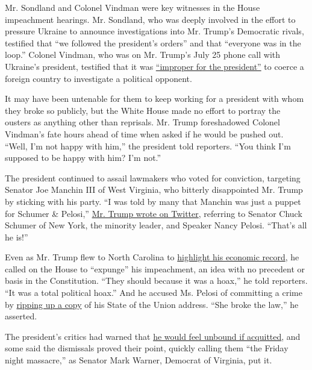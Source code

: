 Mr. Sondland and Colonel Vindman were key witnesses in the House
impeachment hearings. Mr. Sondland, who was deeply involved in the
effort to pressure Ukraine to announce investigations into Mr. Trump's
Democratic rivals, testified that ``we followed the president's orders''
and that ``everyone was in the loop.'' Colonel Vindman, who was on Mr.
Trump's July 25 phone call with Ukraine's president, testified that it
was
\href{https://www.nytimes.com/2019/11/19/us/politics/impeachment-hearings.html}{``improper
for the president''} to coerce a foreign country to investigate a
political opponent.

It may have been untenable for them to keep working for a president with
whom they broke so publicly, but the White House made no effort to
portray the ousters as anything other than reprisals. Mr. Trump
foreshadowed Colonel Vindman's fate hours ahead of time when asked if he
would be pushed out. ``Well, I'm not happy with him,'' the president
told reporters. ``You think I'm supposed to be happy with him? I'm
not.''

The president continued to assail lawmakers who voted for conviction,
targeting Senator Joe Manchin III of West Virginia, who bitterly
disappointed Mr. Trump by sticking with his party. ``I was told by many
that Manchin was just a puppet for Schumer \& Pelosi,''
\href{https://twitter.com/realDonaldTrump/status/1225901404600049664}{Mr.
Trump wrote on Twitter}, referring to Senator Chuck Schumer of New York,
the minority leader, and Speaker Nancy Pelosi. ``That's all he is!''

Even as Mr. Trump flew to North Carolina to
\href{https://www.nytimes.com/2020/02/07/us/politics/trump-north-carolina.html}{highlight
his economic record}, he called on the House to ``expunge'' his
impeachment, an idea with no precedent or basis in the Constitution.
``They should because it was a hoax,'' he told reporters. ``It was a
total political hoax.'' And he accused Ms. Pelosi of committing a crime
by
\href{https://www.nytimes.com/2020/02/04/us/politics/pelosi-trump-handshake.html}{ripping
up a copy} of his State of the Union address. ``She broke the law,'' he
asserted.

The president's critics had warned that
\href{https://www.nytimes.com/2020/02/01/us/politics/trump-impeachment-trial.html}{he
would feel unbound if acquitted}, and some said the dismissals proved
their point, quickly calling them ``the Friday night massacre,'' as
Senator Mark Warner, Democrat of Virginia, put it.

